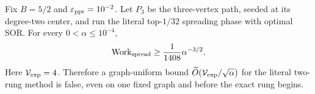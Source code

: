 \begin{theorem}
\label{thm:direct-three-vertex-lower-bound}
Fix $B=5/2$ and $\varepsilon_{\mathrm{ppr}}=10^{-2}$.  Let $P_3$ be the three-vertex path,
seeded at its degree-two center, and run the literal top-$1/32$ spreading
phase with optimal SOR.  For every $0<\alpha\leq10^{-4}$,
\begin{equation}
 \operatorname{Work}_{\rm spread}\geq\frac1{1408}\alpha^{-3/2}.
 \label{eq:direct-three-vertex-lower-bound}
\end{equation}
Here $\mathcal V_{\rm exp}=4$.  Therefore a graph-uniform bound
$\widetilde O(\mathcal V_{\rm exp}/\sqrt\alpha)$ for the literal two-rung
method is false, even on one fixed graph and before the exact rung begins.
\end{theorem}

